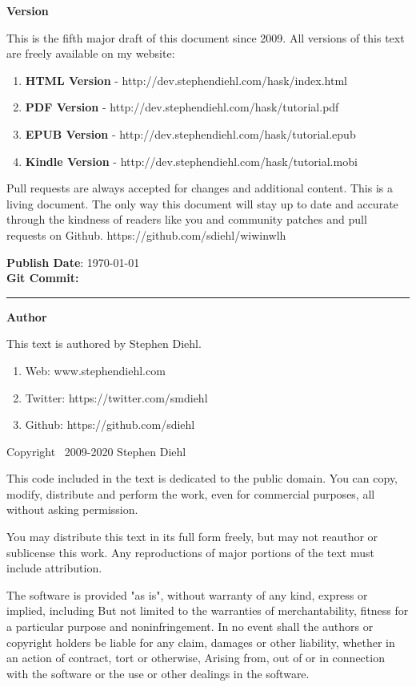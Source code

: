 \Large\textbf{Version}
\normalsize

This is the fifth major draft of this document since 2009. All versions of this
text are freely available on my website:

\begin{enumerate}
\item \textbf{HTML Version}   - http://dev.stephendiehl.com/hask/index.html
\item \textbf{PDF Version}    - http://dev.stephendiehl.com/hask/tutorial.pdf
\item \textbf{EPUB Version}   - http://dev.stephendiehl.com/hask/tutorial.epub
\item \textbf{Kindle Version} - http://dev.stephendiehl.com/hask/tutorial.mobi
\end{enumerate}

Pull requests are always accepted for changes and additional content. This is a
living document.  The only way this document will stay up to date and accurate
through the kindness of readers like you and community patches and pull requests
on Github. https://github.com/sdiehl/wiwinwlh

\textbf{Publish Date}: \today \\
\textbf{Git Commit:} \texttt{}

\par\noindent\rule{\textwidth}{0.4pt}

\Large\textbf{Author}
\normalsize

This text is authored by Stephen Diehl.

\begin{enumerate}
\item Web: www.stephendiehl.com
\item Twitter: https://twitter.com/smdiehl
\item Github: https://github.com/sdiehl
\end{enumerate}

Copyright \textcopyright \ 2009-2020 Stephen Diehl

This code included in the text is dedicated to the public domain.  You can copy,
modify, distribute and perform the work, even for commercial purposes, all
without asking permission.

You may distribute this text in its full form freely, but may not reauthor or
sublicense this work. Any reproductions of major portions of the text must
include attribution.

The software is provided "as is", without warranty of any kind, express or
implied, including But not limited to the warranties of merchantability, fitness
for a particular purpose and noninfringement. In no event shall the authors or
copyright holders be liable for any claim, damages or other liability, whether
in an action of contract, tort or otherwise, Arising from, out of or in
connection with the software or the use or other dealings in the software.
